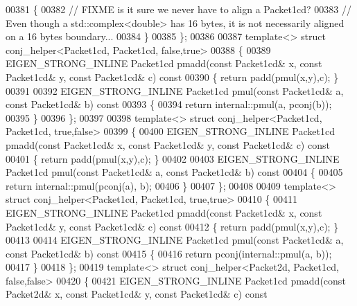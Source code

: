 \begin{DoxyCode}
00381   \{
00382     \textcolor{comment}{// FIXME is it sure we never have to align a Packet1cd?}
00383     \textcolor{comment}{// Even though a std::complex<double> has 16 bytes, it is not necessarily aligned on a 16 bytes
       boundary...}
00384   \}
00385 \};
00386 
00387 \textcolor{keyword}{template}<> \textcolor{keyword}{struct }conj\_helper<Packet1cd, Packet1cd, false,true>
00388 \{
00389   EIGEN\_STRONG\_INLINE Packet1cd pmadd(\textcolor{keyword}{const} Packet1cd& x, \textcolor{keyword}{const} Packet1cd& y, \textcolor{keyword}{const} Packet1cd& c)\textcolor{keyword}{ const}
00390 \textcolor{keyword}{  }\{ \textcolor{keywordflow}{return} padd(pmul(x,y),c); \}
00391 
00392   EIGEN\_STRONG\_INLINE Packet1cd pmul(\textcolor{keyword}{const} Packet1cd& a, \textcolor{keyword}{const} Packet1cd& b)\textcolor{keyword}{ const}
00393 \textcolor{keyword}{  }\{
00394     \textcolor{keywordflow}{return} internal::pmul(a, pconj(b));
00395   \}
00396 \};
00397 
00398 \textcolor{keyword}{template}<> \textcolor{keyword}{struct }conj\_helper<Packet1cd, Packet1cd, true,false>
00399 \{
00400   EIGEN\_STRONG\_INLINE Packet1cd pmadd(\textcolor{keyword}{const} Packet1cd& x, \textcolor{keyword}{const} Packet1cd& y, \textcolor{keyword}{const} Packet1cd& c)\textcolor{keyword}{ const}
00401 \textcolor{keyword}{  }\{ \textcolor{keywordflow}{return} padd(pmul(x,y),c); \}
00402 
00403   EIGEN\_STRONG\_INLINE Packet1cd pmul(\textcolor{keyword}{const} Packet1cd& a, \textcolor{keyword}{const} Packet1cd& b)\textcolor{keyword}{ const}
00404 \textcolor{keyword}{  }\{
00405     \textcolor{keywordflow}{return} internal::pmul(pconj(a), b);
00406   \}
00407 \};
00408 
00409 \textcolor{keyword}{template}<> \textcolor{keyword}{struct }conj\_helper<Packet1cd, Packet1cd, true,true>
00410 \{
00411   EIGEN\_STRONG\_INLINE Packet1cd pmadd(\textcolor{keyword}{const} Packet1cd& x, \textcolor{keyword}{const} Packet1cd& y, \textcolor{keyword}{const} Packet1cd& c)\textcolor{keyword}{ const}
00412 \textcolor{keyword}{  }\{ \textcolor{keywordflow}{return} padd(pmul(x,y),c); \}
00413 
00414   EIGEN\_STRONG\_INLINE Packet1cd pmul(\textcolor{keyword}{const} Packet1cd& a, \textcolor{keyword}{const} Packet1cd& b)\textcolor{keyword}{ const}
00415 \textcolor{keyword}{  }\{
00416     \textcolor{keywordflow}{return} pconj(internal::pmul(a, b));
00417   \}
00418 \};
00419 \textcolor{keyword}{template}<> \textcolor{keyword}{struct }conj\_helper<Packet2d, Packet1cd, false,false>
00420 \{
00421   EIGEN\_STRONG\_INLINE Packet1cd pmadd(\textcolor{keyword}{const} Packet2d& x, \textcolor{keyword}{const} Packet1cd& y, \textcolor{keyword}{const} Packet1cd& c)\textcolor{keyword}{ const}

\end{DoxyCode}
